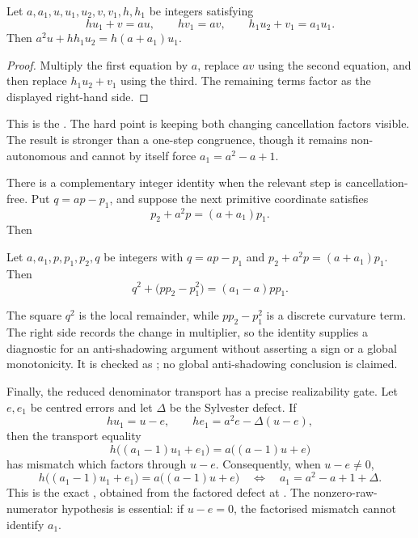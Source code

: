 \begin{theorem}\label{long243:res:secondorder}
Let $a,a_1,u,u_1,u_2,v,v_1,h,h_1$ be integers satisfying
\[
 hu_1+v=au,\qquad hv_1=av,\qquad h_1u_2+v_1=a_1u_1.
\]
Then $a^2u+hh_1u_2=h(a+a_1)u_1$.
\end{theorem}

\begin{proof}
Multiply the first equation by $a$, replace $av$ using the second equation,
and then replace $h_1u_2+v_1$ using the third.  The remaining terms factor as
the displayed right-hand side.
\end{proof}

\noindent This is the
.  The hard point is keeping both changing cancellation
factors visible.  The result is stronger than a one-step congruence, though it
remains non-autonomous and cannot by itself force $a_1=a^2-a+1$.

There is a complementary integer identity when the relevant step is
cancellation-free.  Put $q=ap-p_1$, and suppose the next primitive coordinate
satisfies
\[
 p_2+a^2p=(a+a_1)p_1.
\]
Then
\begin{theorem}\label{long243:res:curvature}
Let $a,a_1,p,p_1,p_2,q$ be integers with $q=ap-p_1$ and
$p_2+a^2p=(a+a_1)p_1$.  Then
\[
 q^2+\bigl(pp_2-p_1^2\bigr)=(a_1-a)pp_1.
\]
\end{theorem}

The square $q^2$ is the local remainder, while $pp_2-p_1^2$ is a discrete
curvature term.  The right side records the change in multiplier, so the
identity supplies a diagnostic for an anti-shadowing argument without
asserting a sign or a global monotonicity.  It is checked as
; no global anti-shadowing conclusion is
claimed.

Finally, the reduced denominator transport has a precise realizability gate.
Let $e,e_1$ be centred errors and let $\Delta$ be the Sylvester defect.  If
\[
 hu_1=u-e,
 \qquad he_1=a^2e-\Delta(u-e),
\]
then the transport equality
\[
 h\bigl((a_1-1)u_1+e_1\bigr)
   =a\bigl((a-1)u+e\bigr)
\]
has mismatch which factors through $u-e$.  Consequently, when $u-e\ne0$,
\[
 h\bigl((a_1-1)u_1+e_1\bigr)
   =a\bigl((a-1)u+e\bigr)
 \quad\Longleftrightarrow\quad
 a_1=a^2-a+1+\Delta.
\]
This is the exact
, obtained from the factored defect at
.  The nonzero-raw-numerator hypothesis is essential: if
$u-e=0$, the factorised mismatch cannot identify $a_1$.

